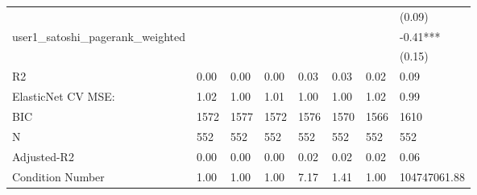 \begin{table}
\begin{center}
\begin{tabular}{llllllll}
                                      &          &            &         &         &          &             & (0.09)        \\
user1_satoshi_pagerank_weighted       &          &            &         &         &          &             & -0.41***      \\
                                      &          &            &         &         &          &             & (0.15)        \\
R2                                    & 0.00     & 0.00       & 0.00    & 0.03    & 0.03     & 0.02        & 0.09          \\
ElasticNet CV MSE:                    & 1.02     & 1.00       & 1.01    & 1.00    & 1.00     & 1.02        & 0.99          \\
BIC                                   & 1572     & 1577       & 1572    & 1576    & 1570     & 1566        & 1610          \\
N                                     & 552      & 552        & 552     & 552     & 552      & 552         & 552           \\
Adjusted-R2                           & 0.00     & 0.00       & 0.00    & 0.02    & 0.02     & 0.02        & 0.06          \\
Condition Number                      & 1.00     & 1.00       & 1.00    & 7.17    & 1.41     & 1.00        & 104747061.88  \\
\hline
\end{tabular}
\end{center}
\end{table}